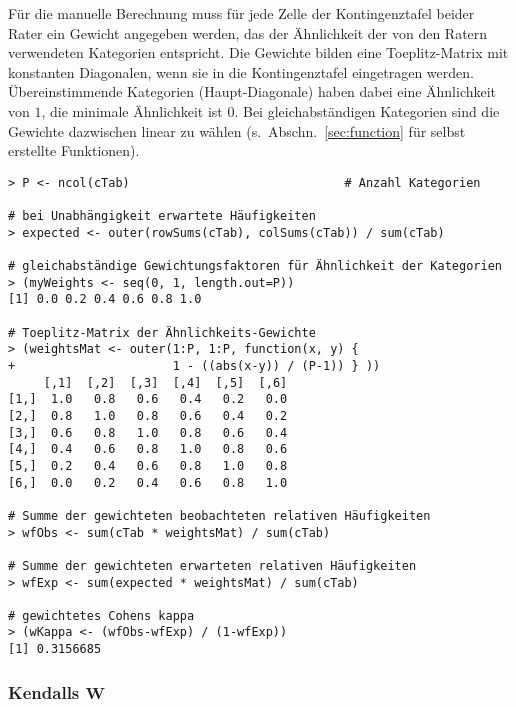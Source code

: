 Für die manuelle Berechnung muss für jede Zelle der Kontingenztafel beider Rater ein Gewicht angegeben werden, das der Ähnlichkeit der von den Ratern verwendeten Kategorien entspricht. Die Gewichte bilden eine Toeplitz-Matrix mit konstanten Diagonalen, wenn sie in die Kontingenztafel eingetragen werden. Übereinstimmende Kategorien (Haupt-Diagonale) haben dabei eine Ähnlichkeit von $1$, die minimale Ähnlichkeit ist $0$. Bei gleichabständigen Kategorien sind die Gewichte dazwischen linear zu wählen (s.\ Abschn.\ \ref{sec:function} für selbst erstellte Funktionen).
\begin{lstlisting}
> P <- ncol(cTab)                              # Anzahl Kategorien

# bei Unabhängigkeit erwartete Häufigkeiten
> expected <- outer(rowSums(cTab), colSums(cTab)) / sum(cTab)

# gleichabständige Gewichtungsfaktoren für Ähnlichkeit der Kategorien
> (myWeights <- seq(0, 1, length.out=P))
[1] 0.0 0.2 0.4 0.6 0.8 1.0

# Toeplitz-Matrix der Ähnlichkeits-Gewichte
> (weightsMat <- outer(1:P, 1:P, function(x, y) {
+                      1 - ((abs(x-y)) / (P-1)) } ))
     [,1]  [,2]  [,3]  [,4]  [,5]  [,6]
[1,]  1.0   0.8   0.6   0.4   0.2   0.0
[2,]  0.8   1.0   0.8   0.6   0.4   0.2
[3,]  0.6   0.8   1.0   0.8   0.6   0.4
[4,]  0.4   0.6   0.8   1.0   0.8   0.6
[5,]  0.2   0.4   0.6   0.8   1.0   0.8
[6,]  0.0   0.2   0.4   0.6   0.8   1.0

# Summe der gewichteten beobachteten relativen Häufigkeiten
> wfObs <- sum(cTab * weightsMat) / sum(cTab)

# Summe der gewichteten erwarteten relativen Häufigkeiten
> wfExp <- sum(expected * weightsMat) / sum(cTab)

# gewichtetes Cohens kappa
> (wKappa <- (wfObs-wfExp) / (1-wfExp))
[1] 0.3156685
\end{lstlisting}

\subsubsection[Kendalls \texorpdfstring{$W$}{W}]{Kendalls $\bm{W}$}


